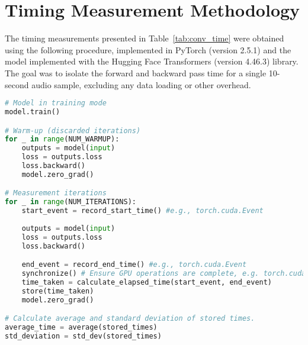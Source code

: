 


\chapter{Timing Measurement Methodology}
\label{app:timing-methodology}

The timing measurements presented in Table~\ref{tab:conv_time} were obtained using the following procedure, implemented in PyTorch (version 2.5.1) and the model implemented with the Hugging Face Transformers (version 4.46.3) library. The goal was to isolate the forward and backward pass time for a single 10-second audio sample, excluding any data loading or other overhead.

\begin{lstlisting}[language=Python, caption=Code used for Time Measurements, basicstyle=\ttfamily\footnotesize, frame=single]
# Model in training mode
model.train()

# Warm-up (discarded iterations)
for _ in range(NUM_WARMUP):
    outputs = model(input)
    loss = outputs.loss
    loss.backward()
    model.zero_grad()

# Measurement iterations
for _ in range(NUM_ITERATIONS):
    start_event = record_start_time() #e.g., torch.cuda.Event
    
    outputs = model(input)
    loss = outputs.loss
    loss.backward()

    end_event = record_end_time() #e.g., torch.cuda.Event
    synchronize() # Ensure GPU operations are complete, e.g. torch.cuda.synchronize
    time_taken = calculate_elapsed_time(start_event, end_event)
    store(time_taken)
    model.zero_grad()

# Calculate average and standard deviation of stored times.
average_time = average(stored_times)
std_deviation = std_dev(stored_times)
\end{lstlisting}
